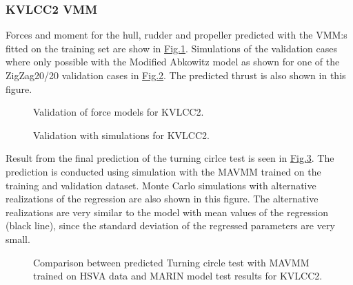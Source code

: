 \documentclass[review]{elsarticle}
\begin{document}
\subsubsection{KVLCC2 VMM}
\label{\detokenize{06.20_results_kvlcc2:kvlcc2-vmm}}
\sphinxAtStartPar
Forces and moment for the hull, rudder and propeller predicted with the VMM:s fitted on the training set are show in \hyperref[\detokenize{06.20_results_kvlcc2:fig-kvlcc2-validation-forces}]{Fig.\@ \ref{\detokenize{06.20_results_kvlcc2:fig-kvlcc2-validation-forces}}}.
Simulations of the validation cases where only possible with the Modified Abkowitz model as shown for one of the ZigZag20/20 validation cases in \hyperref[\detokenize{06.20_results_kvlcc2:fig-kvlcc2-validation-sim}]{Fig.\@ \ref{\detokenize{06.20_results_kvlcc2:fig-kvlcc2-validation-sim}}}. The predicted thrust is also shown in this figure.

\begin{figure}[H]
\centering
\capstart

\noindent{}
\caption{Validation of force models for KVLCC2.}\label{\detokenize{06.20_results_kvlcc2:fig-kvlcc2-validation-forces}}\end{figure}

\begin{figure}[H]
\centering
\capstart

\noindent{}
\caption{Validation with simulations for KVLCC2.}\label{\detokenize{06.20_results_kvlcc2:fig-kvlcc2-validation-sim}}\end{figure}

\sphinxAtStartPar
Result from the final prediction of the turning cirlce test is seen in \hyperref[\detokenize{06.20_results_kvlcc2:fig-kvlcc2-testing-sim}]{Fig.\@ \ref{\detokenize{06.20_results_kvlcc2:fig-kvlcc2-testing-sim}}}. The prediction is conducted using simulation with the MAVMM trained on the training and validation dataset. Monte Carlo simulations with alternative realizations of the regression are also shown in this figure. The alternative realizations are very similar to the model with mean values of the regression (black line), since the standard deviation of the regressed parameters are very small.

\begin{figure}[H]
\centering
\capstart

\noindent{}
\caption{Comparison between predicted Turning circle test with MAVMM trained on HSVA data and MARIN model test results for KVLCC2.}\label{\detokenize{06.20_results_kvlcc2:fig-kvlcc2-testing-sim}}\end{figure}
\end{document}
